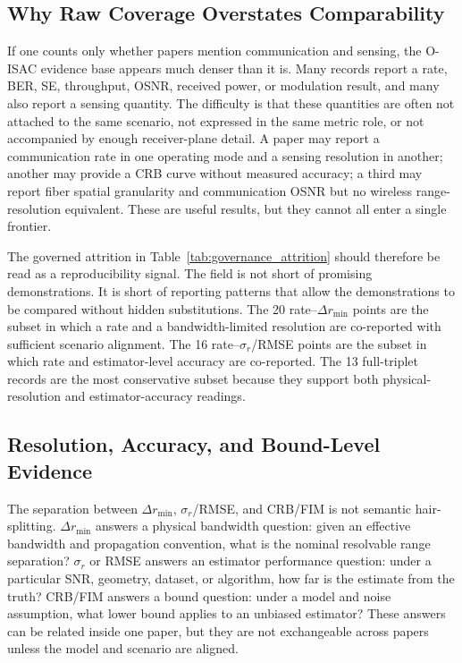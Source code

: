 \documentclass[letterpaper,journal]{IEEEtran}
\begin{document}
\subsection{Why Raw Coverage Overstates Comparability}

If one counts only whether papers mention communication and sensing, the O-ISAC evidence base appears much denser than it is. Many records report a rate, BER, SE, throughput, OSNR, received power, or modulation result, and many also report a sensing quantity. The difficulty is that these quantities are often not attached to the same scenario, not expressed in the same metric role, or not accompanied by enough receiver-plane detail. A paper may report a communication rate in one operating mode and a sensing resolution in another; another may provide a CRB curve without measured accuracy; a third may report fiber spatial granularity and communication OSNR but no wireless range-resolution equivalent. These are useful results, but they cannot all enter a single frontier.

The governed attrition in Table~\ref{tab:governance_attrition} should therefore be read as a reproducibility signal. The field is not short of promising demonstrations. It is short of reporting patterns that allow the demonstrations to be compared without hidden substitutions. The 20 rate--\(\Delta r_{\min}\) points are the subset in which a rate and a bandwidth-limited resolution are co-reported with sufficient scenario alignment. The 16 rate--\(\sigma_r\)/RMSE points are the subset in which rate and estimator-level accuracy are co-reported. The 13 full-triplet records are the most conservative subset because they support both physical-resolution and estimator-accuracy readings.

\subsection{Resolution, Accuracy, and Bound-Level Evidence}

The separation between \(\Delta r_{\min}\), \(\sigma_r\)/RMSE, and CRB/FIM is not semantic hair-splitting. \(\Delta r_{\min}\) answers a physical bandwidth question: given an effective bandwidth and propagation convention, what is the nominal resolvable range separation? \(\sigma_r\) or RMSE answers an estimator performance question: under a particular SNR, geometry, dataset, or algorithm, how far is the estimate from the truth? CRB/FIM answers a bound question: under a model and noise assumption, what lower bound applies to an unbiased estimator? These answers can be related inside one paper, but they are not exchangeable across papers unless the model and scenario are aligned.
\end{document}
